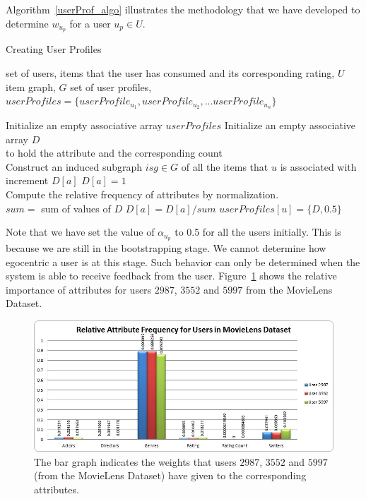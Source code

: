 \documentclass{acm_proc_article-sp}
\begin{document}
Algorithm~\ref{userProf_algo} illustrates the methodology that we have developed to determine $w_{u_p}$ for a user $u_p \in U$.


\begin{algorithm}
\label{userProf_algo}
\caption{Creating User Profiles}
\begin{algorithmic}[1]
\renewcommand{\algorithmicrequire}{\textbf{Input:}}
\renewcommand{\algorithmicensure}{\textbf{Output:}}

\REQUIRE set of users, items that the user has consumed and its corresponding rating, $U$\\
item graph, $G$
\ENSURE set of user profiles, $userProfiles = \{userProfile_{u_1}, userProfile_{u_2}, ... userProfile_{u_n}\}$

\STATE Initialize an empty associative array $userProfiles$
\STATE 
Initialize an empty associative array $D$\\ to hold the attribute and the corresponding count\\
Construct an induced subgraph $isg \in G$ of all the items that $u$ is associated with
   \STATE increment $D[a]$
   \ELSE
   \STATE $D[a] = 1$
  \ENDIF
 \ENDFOR
\ENDFOR\\
\STATE Compute the relative frequency of attributes by normalization.\\
$sum = $ sum of values of $D$
\STATE $D[a] = D[a] / sum$
\ENDFOR
\STATE $userProfiles[u] = \{D, 0.5\}$
\ENDFOR
\end{algorithmic}
\end{algorithm}

Note that we have set the value of $\alpha_{u_p}$ to 0.5 for all the users initially. This is because we are still in the bootstrapping stage. We cannot determine how egocentric a user is at this stage. Such behavior can only be determined when the system is able to receive feedback from the user. Figure~\ref{attribRelFreq_user} shows the relative importance of attributes for users $2987$, $3552$ and $5997$ from the MovieLens Dataset.

\begin{figure}[htp]
\centering
\includegraphics[scale=0.3]{Results/attribRelFreq_user.jpg}
\caption{The bar graph indicates the weights that users $2987$, $3552$ and $5997$ (from the MovieLens Dataset) have given to the corresponding attributes.}
\label{attribRelFreq_user}
\end{figure}
\end{document}

